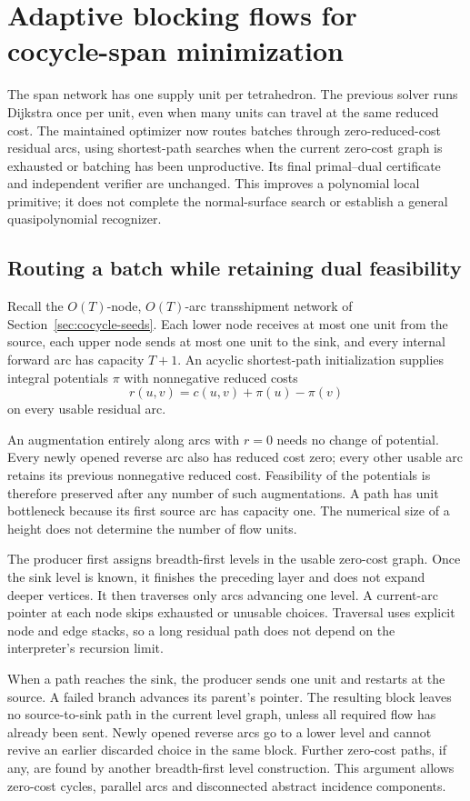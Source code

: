 \section{Adaptive blocking flows for cocycle-span minimization}
\label{sec:cocycle-blocking}

The span network has one supply unit per tetrahedron. The previous solver
runs Dijkstra once per unit, even when many units can travel at the same
reduced cost. The maintained optimizer now routes batches through
zero-reduced-cost residual arcs, using shortest-path searches when the
current zero-cost graph is exhausted or batching has been unproductive.
Its final primal--dual certificate and independent verifier are unchanged.
This improves a polynomial local primitive; it does not complete the
normal-surface search or establish a general quasipolynomial recognizer.

\subsection{Routing a batch while retaining dual feasibility}

Recall the $O(T)$-node, $O(T)$-arc transshipment network of
Section~\ref{sec:cocycle-seeds}. Each lower node receives at most one
unit from the source, each upper node sends at most one unit to the sink,
and every internal forward arc has capacity $T+1$. An acyclic shortest-path
initialization supplies integral potentials $\pi$ with nonnegative
reduced costs
\[
 r(u,v)=c(u,v)+\pi(u)-\pi(v)
\]
on every usable residual arc.

An augmentation entirely along arcs with $r=0$ needs no change of
potential. Every newly opened reverse arc also has reduced cost zero;
every other usable arc retains its previous nonnegative reduced cost.
Feasibility of the potentials is therefore preserved after any number of
such augmentations. A path has unit bottleneck because its first source
arc has capacity one. The numerical size of a height does not determine
the number of flow units.

The producer first assigns breadth-first levels in the usable zero-cost
graph. Once the sink level is known, it finishes the preceding layer and
does not expand deeper vertices. It then traverses only arcs advancing
one level. A current-arc pointer at each node skips exhausted or unusable
choices. Traversal uses explicit node and edge stacks, so a long residual
path does not depend on the interpreter's recursion limit.

When a path reaches the sink, the producer sends one unit and restarts
at the source. A failed branch advances its parent's pointer. The
resulting block leaves no source-to-sink path in the current level graph,
unless all required flow has already been sent. Newly opened reverse arcs
go to a lower level and cannot revive an earlier discarded choice in the
same block. Further zero-cost paths, if any, are found by another
breadth-first level construction. This argument allows zero-cost cycles,
parallel arcs and disconnected abstract incidence components.

